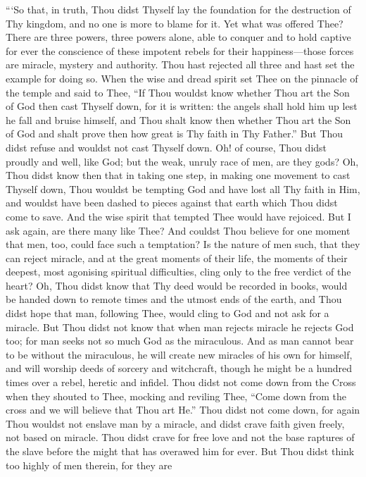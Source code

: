 ```So that, in truth, Thou didst Thyself lay the foundation for the
destruction of Thy kingdom, and no one is more to blame for it. Yet
what was offered Thee? There are three powers, three powers alone,
able to conquer and to hold captive for ever the conscience of these
impotent rebels for their hap\-pi\-ness---those forces are miracle,
mystery and authority. Thou hast rejected all three and hast set the
example for doing so. When the wise and dread spirit set Thee on the
pinnacle of the temple and said to Thee, ``If Thou wouldst know
whether Thou art the Son of God then cast Thyself down, for it is
written: the angels shall hold him up lest he fall and bruise himself,
and Thou shalt know then whether Thou art the Son of God and shalt
prove then how great is Thy faith in Thy Father.'' But Thou didst
refuse and wouldst not cast Thyself down. Oh! of course, Thou didst
proudly and well, like God; but the weak, unruly race of men, are they
gods? Oh, Thou didst know then that in taking one step, in making one
movement to cast Thyself down, Thou wouldst be tempting God and have
lost all Thy faith in Him, and wouldst have been dashed to pieces
against that earth which Thou didst come to save. And the wise spirit
that tempted Thee would have rejoiced. But I ask again, are there many
like Thee? And couldst Thou believe for one moment that men, too,
could face such a temptation? Is the nature of men such, that they can
reject miracle, and at the great moments of their life, the moments of
their deepest, most agonising spiritual difficulties, cling only to
the free verdict of the heart? Oh, Thou didst know that Thy deed would
be recorded in books, would be handed down to remote times and the
utmost ends of the earth, and Thou didst hope that man, following
Thee, would cling to God and not ask for a miracle. But Thou didst not
know that when man rejects miracle he rejects God too; for man seeks
not so much God as the miraculous. And as man cannot bear to be
without the miraculous, he will create new miracles of his own for
himself, and will worship deeds of sorcery and witchcraft, though he
might be a hundred times over a rebel, heretic and infidel. Thou didst
 not come down from the Cross when they shouted to Thee,
mocking and reviling Thee, ``Come down from the cross and we will
believe that Thou art He.'' Thou didst not come down, for again Thou
wouldst not enslave man by a miracle, and didst crave faith given
freely, not based on miracle. Thou didst crave for free love and not
the base raptures of the slave before the might that has overawed him
for ever. But Thou didst think too highly of men therein, for they are
